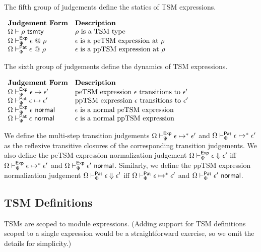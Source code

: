 The fifth group of judgements define the statics of TSM expressions.

\vspace{6px}
$\begin{array}{ll}
\textbf{Judgement Form} & \textbf{Description}\\
\Omega \vdash \rho~\mathsf{tsmty} & \text{$\rho$ is a TSM type}\\
\Omega \vdash_{\Psi}^{\mathsf{Exp}} \epsilon ~@~ \rho & \text{$\epsilon$ is a peTSM expression at $\rho$}\\
\Omega \vdash_{\Phi}^{\mathsf{Pat}} \epsilon ~@~ \rho & \text{$\epsilon$ is a ppTSM expression at $\rho$}
\end{array}$
\vspace{6px}

The sixth group of judgements define the dynamics of TSM expressions.

\vspace{6px}
$\begin{array}{ll}
\textbf{Judgement Form} & \textbf{Description}\\
\Omega \vdash_{\Psi}^\mathsf{Exp} \epsilon \mapsto \epsilon' & \text{peTSM expression $\epsilon$ transitions to $\epsilon'$}\\
\Omega \vdash_{\Psi}^\mathsf{Pat} \epsilon \mapsto \epsilon' & \text{ppTSM expression $\epsilon$ transitions to $\epsilon'$}\\
\Omega \vdash_{\Psi}^\mathsf{Exp} \epsilon~\mathsf{normal} & \text{$\epsilon$ is a normal peTSM expression}\\
\Omega \vdash_{\Psi}^\mathsf{Pat} \epsilon~\mathsf{normal} & \text{$\epsilon$ is a normal ppTSM expression}
\end{array}$
\vspace{6px}

We define the multi-step transition judgements $\Omega \vdash_{\Psi}^\mathsf{Exp} \epsilon \mapsto^{*} \epsilon'$ and $\Omega \vdash_{\Phi}^\mathsf{Pat} \epsilon \mapsto^{*} \epsilon'$ as the reflexive transitive closures of the corresponding transition judgements. We also define the peTSM expression normalization judgement $\Omega \vdash_{\Psi}^\mathsf{Exp} \epsilon \Downarrow \epsilon'$ iff $\Omega \vdash_{\Psi}^\mathsf{Exp} \epsilon \mapsto^{*} \epsilon'$ and $\Omega \vdash_{\Psi}^\mathsf{Exp} \epsilon'~\mathsf{normal}$. Similarly, we define the ppTSM expression normalization judgement $\Omega \vdash_{\Phi}^\mathsf{Pat} \epsilon \Downarrow \epsilon'$ iff $\Omega \vdash_{\Phi}^\mathsf{Pat} \epsilon \mapsto^{*} \epsilon'$ and $\Omega \vdash_{\Phi}^\mathsf{Pat} \epsilon'~\mathsf{normal}$.

\subsection{TSM Definitions}
TSMs are scoped to module expressions. (Adding support for TSM definitions scoped to a single expression would be a straightforward exercise, so we omit the details for simplicity.)

